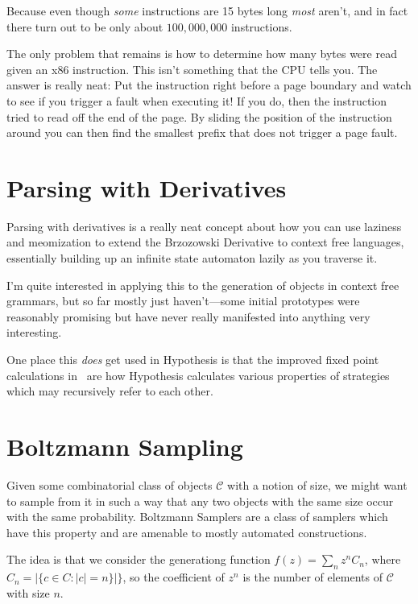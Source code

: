 \documentclass[a4paper]{book}
\begin{document}
Because even though \emph{some} instructions are 15 bytes long \emph{most} aren't,
and in fact there turn out to be only about \(100,000,000\) instructions.

The only problem that remains is how to determine how many bytes were read given an x86 instruction.
This isn't something that the CPU tells you.
The answer is really neat:
Put the instruction right before a page boundary and watch to see if you trigger a fault when executing it!
If you do, then the instruction tried to read off the end of the page.
By sliding the position of the instruction around you can then find the smallest prefix that does not trigger a page fault.

\section{Parsing with Derivatives}

Parsing with derivatives\cite{DBLP:conf/icfp/MightDS11, DBLP:conf/pldi/0001HM16} is a really neat concept about how you can use laziness and meomization to extend the Brzozowski Derivative to context free languages,
essentially building up an infinite state automaton lazily as you traverse it.

I'm quite interested in applying this to the generation of objects in context free grammars,
but so far mostly just haven't---some
initial prototypes were reasonably promising but have never really manifested into anything very interesting.

One place this \emph{does} get used in Hypothesis is that the improved fixed point calculations in~\cite{DBLP:conf/pldi/0001HM16} are how Hypothesis calculates various properties of strategies which may recursively refer to each other.

\section{Boltzmann Sampling}

Given some combinatorial class of objects \(\mathcal{C}\) with a notion of size,
we might want to sample from it in such a way that any two objects with the same size occur with the same probability.
Boltzmann Samplers are a class of samplers which have this property and are amenable to mostly automated constructions.

The idea is that we consider the generationg function \(f(z) = \sum\limits_n z^n C_n\),
where \(C_n =  |\{c \in C: |c| = n\}|\}\),
so the coefficient of \(z^n\) is the number of elements of \(\mathcal{C}\) with size \(n\).
\end{document}
